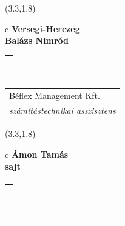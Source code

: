 \documentclass[11pt]{article}
\begin{document}
\makebox(3.3,1.8){
  \renewcommand\arraystretch{1.3}
  \begin{tabular}[c]{c}
    \hspace{8.5mm}
    \LARGE\bf{Versegi-Herczeg}\\
    \hspace{8.5mm}
    \LARGE\bf{Balázs Nimród}\\
    \hspace{8.5mm}
    \renewcommand\arraystretch{3}
    \begin{tabular}[c]{c}
      \centering
      \fontfamily{phv}\selectfont{
        \textbf{
          \textsc{
            \scriptsize{
            \color{Dark}{ Ismerkedő }\color{Dark}{ Webmester }\color{Bright}{ Sminkmester }\color{Bright}{ Programozó }
            }
          }
        }
      }
    \end{tabular}
    \\
    \renewcommand\arraystretch{1}
    \begin{tabular}{p{3.3in}}
      \hspace{.7cm}Béflex Management Kft.\\
      \hspace{.7cm}\emph{ számítástechnikai asszisztens }\\
    \end{tabular}
  \end{tabular}
}

\makebox(3.3,1.8){
  \renewcommand\arraystretch{1.3}
  \begin{tabular}[c]{c}
    \hspace{8.5mm}
    \LARGE\bf{ Ámon Tamás }\\
    \hspace{8.5mm}
    \Large{ sajt }\\
    \renewcommand\arraystretch{3}
    \begin{tabular}[c]{c}
      \centering
      \fontfamily{phv}\selectfont{
        \textbf{
          \textsc{
            \scriptsize{
            \color{Bright}{ Ismerkedő }\color{Dark}{ Webmester }\color{Bright}{ Sminkmester }\color{Dark}{ Programozó }
            }
          }
        }
      }
    \end{tabular}
    \\
    \renewcommand\arraystretch{1}
    \begin{tabular}{p{3.3in}}
      \hspace{.7cm}\\
      \hspace{.7cm}\emph{  }\\
    \end{tabular}
  \end{tabular}
}
\end{document}
